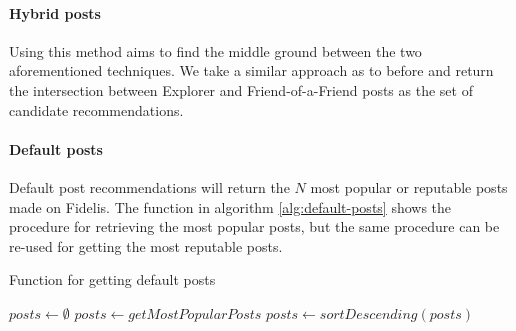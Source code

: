 \paragraph{Hybrid posts} Using this method aims to find the middle ground between the two aforementioned techniques. We take a similar approach as to before and return the intersection between Explorer and Friend-of-a-Friend posts as the set of candidate recommendations.

\paragraph{Default posts} Default post recommendations will return the $N$ most popular or reputable posts made on Fidelis. The function in algorithm \ref{alg:default-posts} shows the procedure for retrieving the most popular posts, but the same procedure can be re-used for getting the most reputable posts.

\begin{algorithm}[H]
\caption{Function for getting default posts}
\label{alg:default-posts}
\begin{algorithmic}[1]
    \State $posts\gets \emptyset$
    \State $posts\gets getMostPopularPosts$
    \State $posts\gets sortDescending(posts)$
    \State {}
\EndFunction
\end{algorithmic}
\end{algorithm}